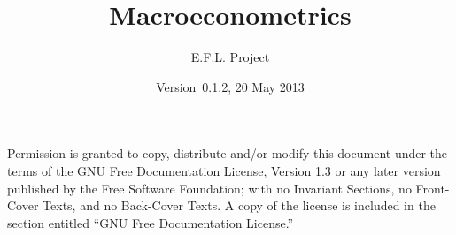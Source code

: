 \documentclass[nofonts,notitlepage]{tufte-latex/tufte-handout}
\title{Macroeconometrics}
\author{E.F.L. Project}
\date{Version~0.1.2, 20 May 2013}
\begin{document}
\maketitle
\tableofcontents

  Permission is granted to
copy, distribute and/or modify this document under the terms of the
GNU Free Documentation License, Version 1.3 or any later version
published by the Free Software Foundation; with no Invariant Sections,
no Front-Cover Texts, and no Back-Cover Texts.  A copy of the license
is included in the section entitled ``GNU Free Documentation
License.''






\appendix

\end{document}
